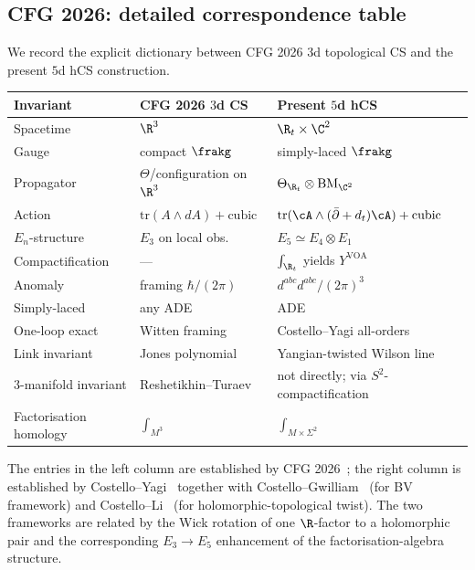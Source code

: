 \subsection*{CFG 2026: detailed correspondence table}

We record the explicit dictionary between CFG 2026 $3$d topological
CS and the present $5$d hCS construction.

\begin{center}
\begin{tabular}{l|l|l}
\textbf{Invariant} & \textbf{CFG 2026 $3$d CS} & \textbf{Present $5$d hCS}\\
\hline
Spacetime & $\R^3$ & $\R_t\times \C^2$ \\
Gauge & compact $\frakg$ & simply-laced $\frakg$ \\
Propagator & $\Theta$/configuration on $\R^3$ & $\Theta_{\R_t}\otimes\mathrm{BM}_{\C^2}$ \\
Action & $\mathrm{tr}(A\wedge dA) + \mathrm{cubic}$ &
$\mathrm{tr}(\cA\wedge (\bar\partial + d_t)\cA) + \mathrm{cubic}$ \\
$E_n$-structure & $E_3$ on local obs. & $E_5\simeq E_4\otimes E_1$ \\
Compactification & — & $\int_{\R_t}$ yields $Y^{\mathrm{VOA}}$ \\
Anomaly & framing $\hbar/(2\pi)$ & $d^{abc}d^{abc}/(2\pi)^3$ \\
Simply-laced & any ADE & ADE \\
One-loop exact & Witten framing & Costello--Yagi all-orders \\
Link invariant & Jones polynomial & Yangian-twisted Wilson line \\
$3$-manifold invariant & Reshetikhin--Turaev & not directly; via $S^2$-compactification \\
Factorisation homology & $\int_{M^3}$ & $\int_{M\times\Sigma^2}$ \\
\end{tabular}
\end{center}

The entries in the left column are established by
CFG 2026~\cite{CFG2026}; the right column is established by
Costello--Yagi~\cite{CostelloYagi2018} together with
Costello--Gwilliam~\cite{CostelloGwilliam} (for BV framework) and
Costello--Li~\cite{CostelloLi2020} (for holomorphic-topological
twist). The two frameworks are related by the Wick rotation of one
$\R$-factor to a holomorphic pair and the corresponding
$E_3\to E_5$ enhancement of the factorisation-algebra structure.

